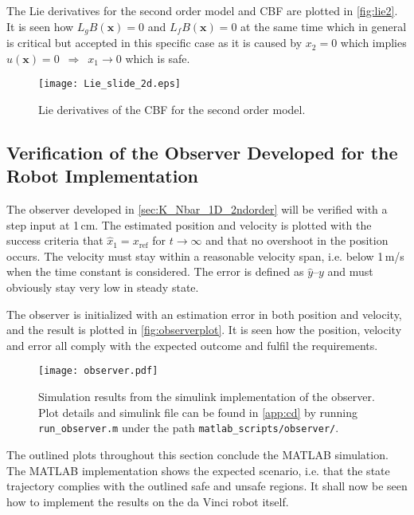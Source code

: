 The Lie derivatives for the second order model and CBF are plotted in \autoref{fig:lie2}.
It is seen how $L_gB(\mathbf{x}) = 0$ and $L_fB(\mathbf{x}) = 0$ at the same time which in general is critical but accepted in this specific case as it is caused by $x_2=0$ which implies $u(\mathbf{x})=0 \,\,\, \Rightarrow \,\,\, x_1 \rightarrow 0$ which is safe.
\begin{figure}[H]
\hspace{-7mm}
		\texttt{[image: Lie\_slide\_2d.eps]}
	\caption{Lie derivatives of the CBF for the second order model. }
	\label{fig:lie2}
\end{figure}
\subsection{Verification of the Observer Developed for the Robot Implementation}
\vspace{-2mm}
The observer developed in \autoref{sec:K_Nbar_1D_2ndorder} will be verified with a step input at 1\,cm. The estimated position and velocity is plotted with the success criteria that $\hat{x}_1 = x_\text{ref}$ for $t \rightarrow \infty$ and that no overshoot in the position occurs. The velocity must stay within a reasonable velocity span, i.e. below 1\,m/s when the time constant is considered. The error is defined as $\hat{y}$--$y$ and must obviously stay very low in steady state.

The  observer is initialized with an estimation error in both position and velocity, and the result is plotted in \autoref{fig:observerplot}. It is seen how the position, velocity and error all comply with the expected outcome and fulfil the requirements.
\begin{figure}[H]
\hspace{-7mm}
		\texttt{[image: observer.pdf]}
	\caption{Simulation results from the simulink implementation of the observer. Plot details and simulink file can be found in \autoref{app:cd} by running \texttt{run\_observer.m} under the path \texttt{matlab\_scripts/observer/}.}
	\label{fig:observerplot}
\end{figure}
The outlined plots throughout this section conclude the MATLAB simulation. The MATLAB implementation shows the expected scenario, i.e. that the state trajectory complies with the outlined safe and unsafe regions. It shall now be seen how to implement the results on the da Vinci robot itself.

